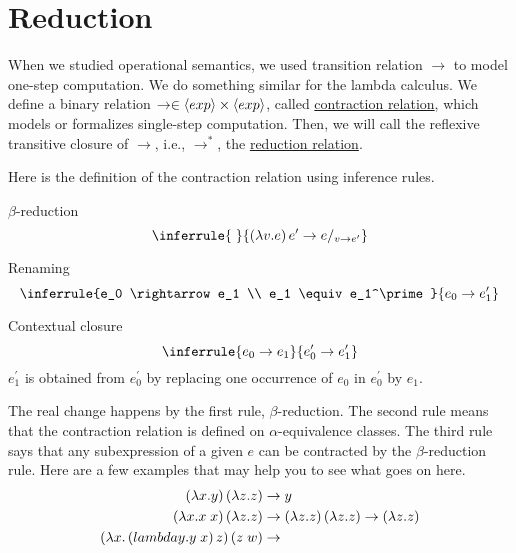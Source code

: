 \section{Reduction}

\begin{enumcirc}
	\item
	When we studied operational semantics, we used transition relation
	$\rightarrow$ to model one-step computation.
	We do something similar for the lambda calculus.
	We define a binary relation
	$\rightarrow \in \left\langle exp \right\rangle \times \left\langle exp \right\rangle$,
	called \ul{contraction relation}, which models or formalizes single-step
	computation.
	Then, we will call the reflexive transitive closure of $\rightarrow$, i.e.,
	$\rightarrow^*$, the \ul{reduction relation}.
	\item
	Here is the definition of the contraction relation using inference rules.
	\begin{enumrm}
		\item
		$\beta$-reduction
		\[
			\inferrule
			{\;}
			{\prths{\lambda v. e}{e^\prime} \rightarrow \subst{e}{v}{e^\prime}}
		\]
		\item
		Renaming
		\[
			\inferrule
			{e_0 \rightarrow e_1 \\ e_1 \equiv e_1^\prime}
			{e_0 \rightarrow e_1^\prime}
		\]
		\item
		Contextual closure
		\[
			\inferrule
			{e_0 \rightarrow e_1}
			{e_0^\prime \rightarrow e_1^\prime}
		\]
		$e_1^\prime$ is obtained from $e_0^\prime$ by replacing one occurrence of
		$e_0$ in $e_0^\prime$ by $e_1$.
	\end{enumrm}
	\item
	The real change happens by the first rule, $\beta$-reduction.
	The second rule means that the contraction relation is defined on
	$\alpha$-equivalence classes.
	The third rule says that any subexpression of a given $e$ can be contracted by
	the $\beta$-reduction rule.
	Here are a few examples that may help you to see what goes on here.
	\begin{align*}
		\prths{\lambda x. y} \prths{\lambda z. z}                    & \rightarrow y \\
		\prths{\lambda x. x \; x} \prths{\lambda z. z}               & \rightarrow
		\prths{\lambda z. z} \prths{\lambda z. z} \rightarrow
		\prths{\lambda z. z}                                                         \\
		\prths{\lambda x. \prths{lambda y. y \; x} z} \prths{z \; w} & \rightarrow

\end{align*}
\end{enumcirc}
